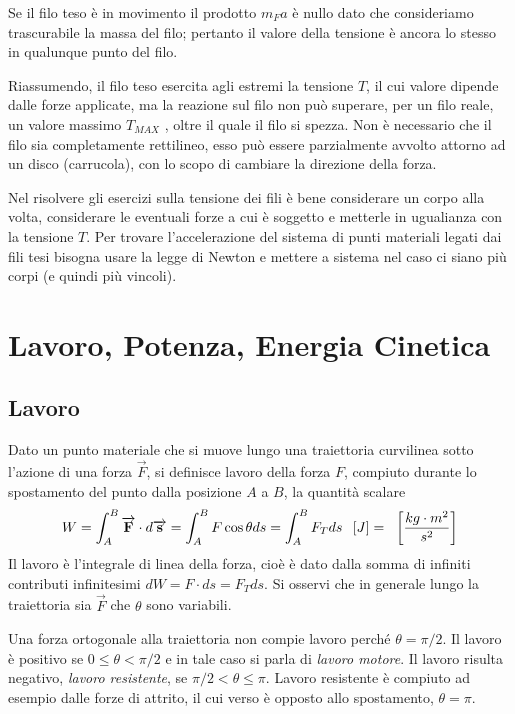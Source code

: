 \documentclass[class=book, crop=false, oneside, 12pt]{standalone}
\begin{document}
Se il filo teso è in movimento il prodotto \(m_F a\) è nullo dato che consideriamo trascurabile la massa del filo; pertanto il valore della tensione è ancora lo stesso in qualunque punto del filo.

Riassumendo, il filo teso esercita agli estremi la tensione \(T\), il cui valore dipende dalle forze applicate, ma la reazione sul filo non può superare, per un filo reale, un valore massimo \(T_{MAX}\) , oltre il quale il filo si spezza.\newline
Non è necessario che il filo sia completamente rettilineo, esso può essere parzialmente avvolto attorno ad un disco (carrucola), con lo scopo di cambiare la direzione della forza.

Nel risolvere gli esercizi sulla tensione dei fili è bene considerare un corpo alla volta, considerare le eventuali forze a cui è soggetto e metterle in ugualianza con la tensione \(T\).
Per trovare l'accelerazione del sistema di punti materiali legati dai fili tesi bisogna usare la legge di Newton e mettere a sistema nel caso ci siano più corpi (e quindi più vincoli).

\section{Lavoro, Potenza, Energia Cinetica}

\subsection{Lavoro}

Dato un punto materiale che si muove lungo una traiettoria curvilinea sotto l'azione di una forza \(\overrightarrow{F}\), si definisce lavoro della forza \(F\), compiuto durante lo spostamento del punto dalla posizione \(A\) a \(B\), la quantità scalare
\begin{equation}
    W = \int_A^B \overrightarrow{F} \cdot d \overrightarrow{s} = \int_A^B F \cos \theta ds = \int_A^B F_T ds \udm{J} = \udm{\frac{kg \cdot m^2}{s^2}}
\end{equation}
Il lavoro è l'integrale di linea della forza, cioè è dato dalla somma di infiniti contributi infinitesimi \(d W = F \cdot d s = F_T d s\).
Si osservi che in generale lungo la traiettoria sia \(\overrightarrow{F}\) che \(\theta\) sono variabili.

Una forza ortogonale alla traiettoria non compie lavoro perché \(\theta = \pi / 2 \).
Il lavoro è positivo se \(0 \leq \theta < \pi / 2\) e in tale caso si parla di \emph{lavoro motore}.
Il lavoro risulta negativo, \emph{lavoro resistente}, se \(\pi / 2 < \theta \leq \pi \).
Lavoro resistente è compiuto ad esempio dalle forze di attrito, il cui verso è opposto allo spostamento, \(\theta = \pi\).
\end{document}
